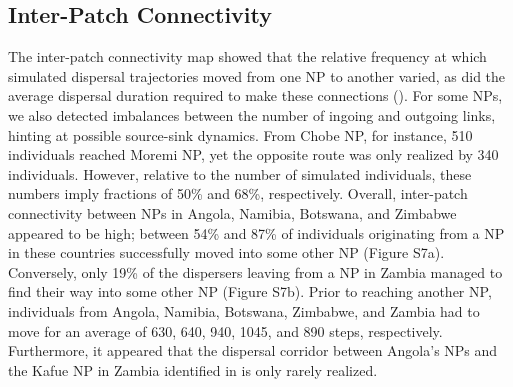 \documentclass[abstract=on,10pt,a4paper,bibliography=totocnumbered]{article}
\begin{document}
\subsection{Inter-Patch Connectivity}
The inter-patch connectivity map showed that the relative frequency at which
simulated dispersal trajectories moved from one NP to another varied, as did the
average dispersal duration required to make these connections
(). For some NPs, we also detected imbalances
between the number of ingoing and outgoing links, hinting at possible
source-sink dynamics. From Chobe NP, for instance, 510 individuals reached
Moremi NP, yet the opposite route was only realized by 340 individuals. However,
relative to the number of simulated individuals, these numbers imply fractions
of 50\% and 68\%, respectively. Overall, inter-patch connectivity between NPs in
Angola, Namibia, Botswana, and Zimbabwe appeared to be high; between 54\% and
87\% of individuals originating from a NP in these countries successfully moved
into some other NP (Figure S7a). Conversely, only 19\% of the dispersers leaving
from a NP in Zambia managed to find their way into some other NP (Figure S7b).
Prior to reaching another NP, individuals from Angola, Namibia, Botswana,
Zimbabwe, and Zambia had to move for an average of 630, 640, 940, 1045, and 890
steps, respectively. Furthermore, it appeared that the dispersal corridor
between Angola's NPs and the Kafue NP in Zambia identified in
 is only rarely realized.
\end{document}
